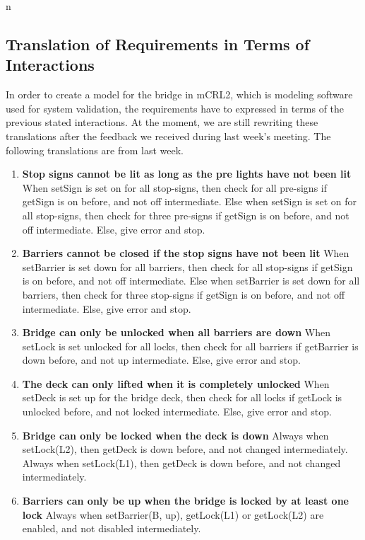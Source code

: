n\subsection{Translation of Requirements in Terms of Interactions}

In order to create a model for the bridge in mCRL2, which is modeling software used for system validation, the requirements have to expressed in terms of the previous stated interactions. At the moment, we are still rewriting these translations after the feedback we received during last week's meeting. The following translations are from last week.

\begin{enumerate}
	\item \textbf{Stop signs cannot be lit as long as the pre lights have not been lit}
	When setSign is set on for all stop-signs, then check for all pre-signs if getSign is on before, and not off intermediate.
	Else when setSign is set on for all stop-signs, then check for three pre-signs if getSign is on before, and not off intermediate.
	Else, give error and stop.

	\item \textbf{Barriers cannot be closed if the stop signs have not been lit}
	When setBarrier is set down for all barriers, then check for all stop-signs if getSign is on before, and not off intermediate.
	Else when setBarrier is set down for all barriers, then check for three stop-signs if getSign is on before, and not off intermediate.
	Else, give error and stop.

	\item \textbf{Bridge can only be unlocked when all barriers are down}
	When setLock is set unlocked for all locks, then check for all barriers if getBarrier is down before, and not up intermediate.
	Else, give error and stop.

	\item	\textbf{The deck can only lifted when it is completely unlocked}
	When setDeck is set up for the bridge deck, then check for all locks if getLock is unlocked before, and not locked intermediate.
	Else, give error and stop.

	\item \textbf{Bridge can only be locked when the deck is down}
	Always when setLock(L2), then getDeck is down before, and not changed intermediately.
	Always when setLock(L1), then getDeck is down before, and not changed intermediately.

	\item \textbf{Barriers can only be up when the bridge is locked by at least one lock}
	Always when setBarrier(B, up), getLock(L1) or getLock(L2) are enabled, and not disabled intermediately.


\end{enumerate}
